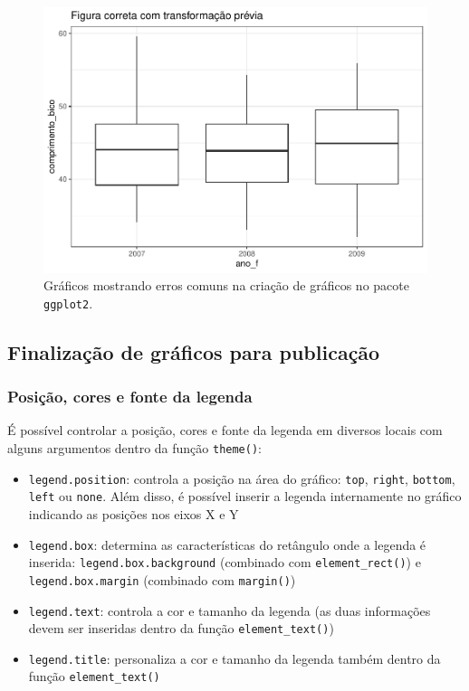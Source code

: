 \documentclass[
]{article}
\begin{document}
\begin{figure}
\centering
\includegraphics{epr_files/figure-latex/fig-plot-error-3.pdf}
\caption{\label{fig:fig-plot-error-3}Gráficos mostrando erros comuns na criação de gráficos no pacote \texttt{ggplot2}.}
\end{figure}

\hypertarget{finalizauxe7uxe3o-de-gruxe1ficos-para-publicauxe7uxe3o}{%
\subsection{Finalização de gráficos para publicação}\label{finalizauxe7uxe3o-de-gruxe1ficos-para-publicauxe7uxe3o}}

\hypertarget{posiuxe7uxe3o-cores-e-fonte-da-legenda}{%
\subsubsection{Posição, cores e fonte da legenda}\label{posiuxe7uxe3o-cores-e-fonte-da-legenda}}

É possível controlar a posição, cores e fonte da legenda em diversos locais com alguns argumentos dentro da função \texttt{theme()}:

\begin{itemize}
\item
  \texttt{legend.position}: controla a posição na área do gráfico: \texttt{top}, \texttt{right}, \texttt{bottom}, \texttt{left} ou \texttt{none}. Além disso, é possível inserir a legenda internamente no gráfico indicando as posições nos eixos X e Y
\item
  \texttt{legend.box}: determina as características do retângulo onde a legenda é inserida: \texttt{legend.box.background} (combinado com \texttt{element\_rect()}) e \texttt{legend.box.margin} (combinado com \texttt{margin()})
\item
  \texttt{legend.text}: controla a cor e tamanho da legenda (as duas informações devem ser inseridas dentro da função \texttt{element\_text()})
\item
  \texttt{legend.title}: personaliza a cor e tamanho da legenda também dentro da função \texttt{element\_text()}
\end{itemize}
\end{document}
